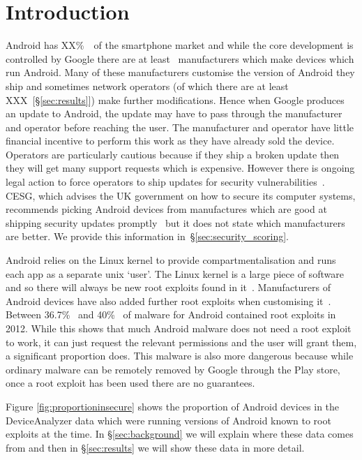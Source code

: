 \documentclass[conference,a4paper,twoside]{IEEEtran}
\newcommand{\percMarketShare}{XX\%~\cite{TODO}}
\newcommand{\daNumNetworkOperators}{XXX~[\S\ref{sec:results}]}
\begin{document}
\section{Introduction}
Android has \percMarketShare\ of the smartphone market and while the core development is controlled by Google there are at least \daNumManufacturers\ manufacturers which make devices which run Android.
Many of these manufacturers customise the version of Android they ship and sometimes network operators (of which there are at least \daNumNetworkOperators) make further modifications.
Hence when Google produces an update to Android, the update may have to pass through the manufacturer and operator before reaching the user.
The manufacturer and operator have little financial incentive to perform this work as they have already sold the device.
Operators are particularly cautious because if they ship a broken update then they will get many support requests which is expensive.
However there is ongoing legal action to force operators to ship updates for security vulnerabilities~\cite{Soghoian2013}.
CESG, which advises the UK government on how to secure its computer systems, recommends picking Android devices from manufactures which are good at shipping security updates promptly~\cite{CESG2013} but it does not state which manufacturers are better.
We provide this information in~\S\ref{sec:security_scoring}.

Android relies on the Linux kernel to provide compartmentalisation and runs each app as a separate unix `user'.
The Linux kernel is a large piece of software and so there will always be new root exploits found in it~\cite{TODO}.
Manufacturers of Android devices have also added further root exploits when customising it~\cite{Grace2012}.
Between 36.7\%~\cite{Zhou2012b} and 40\%~\cite{Zhou2012a} of malware for Android contained root exploits in 2012.
While this shows that much Android malware does not need a root exploit to work, it can just request the relevant permissions and the user will grant them, a significant proportion does.
This malware is also more dangerous because while ordinary malware can be remotely removed by Google through the Play store, once a root exploit has been used there are no guarantees.

Figure \ref{fig:proportioninsecure} shows the proportion of Android devices in the DeviceAnalyzer data which were running versions of Android known to root exploits at the time.
In \S\ref{sec:background} we will explain where these data comes from and then in \S\ref{sec:results} we will show these data in more detail.
\end{document}
